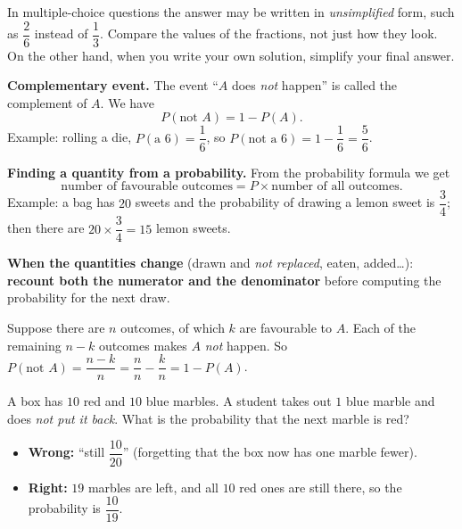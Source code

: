 \begin{tipbox}
In multiple-choice questions the answer may be written in \emph{unsimplified} form, such as $\dfrac{2}{6}$ instead of $\dfrac13$. Compare the values of the fractions, not just how they look. On the other hand, when you write your own solution, simplify your final answer.
\end{tipbox}

\begin{knowbox}
\textbf{Complementary event.} The event ``$A$ does \emph{not} happen'' is called the complement of $A$. We have
\[
P(\text{not } A)=1-P(A).
\]
Example: rolling a die, $P(\text{a }6)=\dfrac16$, so $P(\text{not a }6)=1-\dfrac16=\dfrac56$.

\medskip
\textbf{Finding a quantity from a probability.} From the probability formula we get
\[
\text{number of favourable outcomes}=P\times\text{number of all outcomes}.
\]
Example: a bag has $20$ sweets and the probability of drawing a lemon sweet is $\dfrac{3}{4}$; then there are $20\times\dfrac34=15$ lemon sweets.

\medskip
\textbf{When the quantities change} (drawn and \emph{not replaced}, eaten, added\ldots): \textbf{recount both the numerator and the denominator} before computing the probability for the next draw.
\end{knowbox}

\begin{proofbox}
Suppose there are $n$ outcomes, of which $k$ are favourable to $A$. Each of the remaining $n-k$ outcomes makes $A$ \emph{not} happen. So
$P(\text{not }A)=\dfrac{n-k}{n}=\dfrac{n}{n}-\dfrac{k}{n}=1-P(A)$.
\end{proofbox}

\begin{warnbox}
A box has $10$ red and $10$ blue marbles. A student takes out $1$ blue marble and does \emph{not put it back}. What is the probability that the next marble is red?
\begin{itemize}[leftmargin=1.2em,itemsep=1pt,topsep=2pt]
\item \textbf{Wrong:} ``still $\dfrac{10}{20}$'' (forgetting that the box now has one marble fewer).
\item \textbf{Right:} $19$ marbles are left, and all $10$ red ones are still there, so the probability is $\dfrac{10}{19}$.
\end{itemize}
\end{warnbox}

